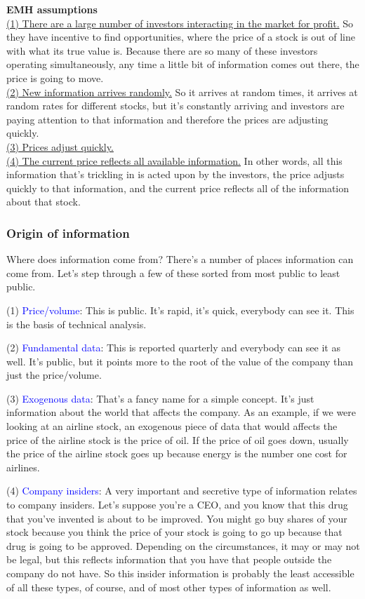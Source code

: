 \documentclass[12pt]{article}
\begin{document}
\noindent
\textbf{EMH assumptions} \\
\underline{(1) There are a large number of investors interacting in the market for profit.} So they have incentive to find opportunities, where the price of a stock is out of line with what its true value is. Because there are so many of these investors operating simultaneously, any time a little bit of information comes out there, the price is going to move. \\
\underline{(2) New information arrives randomly.} So it arrives at random times, it arrives at random rates for different stocks, but it's constantly arriving and investors are paying attention to that information and therefore the prices are adjusting quickly. \\
\underline{(3) Prices adjust quickly.} \\
\underline{(4) The current price reflects all available information.} In other words, all this information that's trickling in is acted upon by the investors, the price adjusts quickly to that information, and the current price reflects all of the information about that stock. 

\subsubsection{Origin of information}

Where does information come from? There's a number of places information can come from. Let's step through a few of these sorted from most public to least public. 

\noindent
(1) \textcolor{blue}{Price/volume}: This is public. It's rapid, it's quick, everybody can see it. This is the basis of technical analysis.

\noindent
(2) \textcolor{blue}{Fundamental data}: This is reported quarterly and everybody can see it as well. It's public, but it points more to the root of the value of the company than just the price/volume. 

\noindent
(3) \textcolor{blue}{Exogenous data}: That's a fancy name for a simple concept. It's just information about the world that affects the company. As an example, if we were looking at an airline stock, an exogenous piece of data that would affects the price of the airline stock is the price of oil. If the price of oil goes down, usually the price of the airline stock goes up because energy is the number one cost for airlines. 

\noindent
(4) \textcolor{blue}{Company insiders}: A very important and secretive type of information relates to company insiders. Let's suppose you're a CEO, and you know that this drug that you've invented is about to be improved. You might go buy shares of your stock because you think the price of your stock is going to go up because that drug is going to be approved. Depending on the circumstances, it may or may not be legal, but this reflects information that you have that people outside the company do not have. So this insider information is probably the least accessible of all these types, of course, and of most other types of information as well. 
\end{document}
